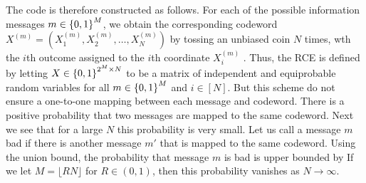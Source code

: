 \documentclass[letterpaper,english,10pt]{article}
\begin{document}
The code is therefore constructed as follows. 
For each of the possible information messages $m \in \left\{0, 1\right\}^M$, 
we obtain the corresponding codeword $X^{(m)} = (X_1^{(m)}, X_2^{(m)}, \dots, X_N^{(m)})$ by tossing an unbiased coin $N$ times, wth the $i$th outcome assigned to the $i$th coordinate $X_i^{(m)}$ .
Thus, the RCE is defined by letting $X \in \left\{0,1\right\}^{2^M \times N}$ to be a matrix of independent and equiprobable random variables for all $m \in \left\{0,1\right\}^M$ and $i \in [N]$.  
But this scheme do not ensure a one-to-one mapping between each message and codeword.
There is a positive probability that two messages are mapped to the same codeword. 
Next we see that for a large $N$ this probability is very small. 
Let us call a message $m$ bad if there is another message $m'$ that is mapped to the same codeword. Using the union bound, the probability that message $m$ is
bad is upper bounded by
If we let $M = \lfloor RN\rfloor$ for $R \in (0,1)$, then this probability vanishes as $N \to \infty$.
\end{document}
